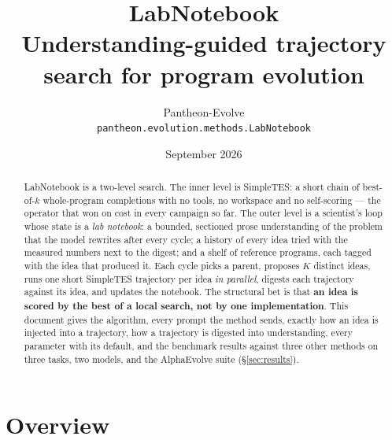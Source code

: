 \documentclass[11pt]{article}
\title{\textbf{LabNotebook}\\[2mm]
\large Understanding-guided trajectory search for program evolution}
\author{Pantheon-Evolve \\ \small\texttt{pantheon.evolution.methods.LabNotebook}}
\date{September 2026}
\begin{document}
\maketitle

\begin{abstract}
\noindent LabNotebook is a two-level search. The inner level is SimpleTES: a short chain of
best-of-$k$ whole-program completions with no tools, no workspace and no self-scoring --- the
operator that won on cost in every campaign so far. The outer level is a scientist's loop whose
state is a \emph{lab notebook}: a bounded, sectioned prose understanding of the problem that the
model rewrites after every cycle; a history of every idea tried with the measured numbers next to
the digest; and a shelf of reference programs, each tagged with the idea that produced it. Each
cycle picks a parent, proposes $K$ distinct ideas, runs one short SimpleTES trajectory per idea
\emph{in parallel}, digests each trajectory against its idea, and updates the notebook. The
structural bet is that \textbf{an idea is scored by the best of a local search, not by one
implementation}. This document gives the algorithm, every prompt the method sends, exactly how an
idea is injected into a trajectory, how a trajectory is digested into understanding, every
parameter with its default, and the benchmark results against three other methods on three tasks,
two models, and the AlphaEvolve suite (\S\ref{sec:results}).
\end{abstract}

\section{Overview}
\end{document}
